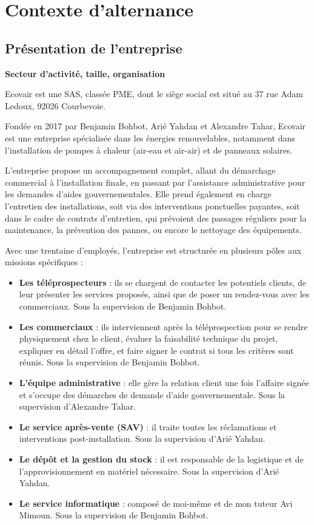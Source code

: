 

\section{Contexte d’alternance}
\label{context}

\subsection{Présentation de l’entreprise}

\textbf{Secteur d’activité, taille, organisation}

Ecovair est une SAS, classée PME, dont le siège social est situé au 37 rue Adam Ledoux, 92026 Courbevoie.

Fondée en 2017 par Benjamin Bohbot, Arié Yahdan et Alexandre Tahar, Ecovair est une entreprise spécialisée dans les énergies renouvelables, notamment dans l'installation de pompes à chaleur (air-eau et air-air) et de panneaux solaires.

L’entreprise propose un accompagnement complet, allant du démarchage commercial à l’installation finale, en passant par l’assistance administrative pour les demandes d’aides gouvernementales. Elle prend également en charge l’entretien des installations, soit via des interventions ponctuelles payantes, soit dans le cadre de contrats d’entretien, qui prévoient des passages réguliers pour la maintenance, la prévention des pannes, ou encore le nettoyage des équipements.

Avec une trentaine d’employés, l’entreprise est structurée en plusieurs pôles aux missions spécifiques :

\begin{itemize}
    \item \textbf{Les téléprospecteurs} : ils se chargent de contacter les potentiels clients, de leur présenter les services proposés, ainsi que de poser un rendez-vous avec les commerciaux. Sous la supervision de Benjamin Bohbot.
    \item \textbf{Les commerciaux} : ils interviennent après la téléprospection pour se rendre physiquement chez le client, évaluer la faisabilité technique du projet, expliquer en détail l’offre, et faire signer le contrat si tous les critères sont réunis. Sous la supervision de Benjamin Bohbot.
    \item \textbf{L’équipe administrative} : elle gère la relation client une fois l’affaire signée et s’occupe des démarches de demande d’aide gouvernementale. Sous la supervision d’Alexandre Tahar.
    \item \textbf{Le service après-vente (SAV)} : il traite toutes les réclamations et interventions post-installation. Sous la supervision d’Arié Yahdan.
    \item \textbf{Le dépôt et la gestion du stock} : il est responsable de la logistique et de l’approvisionnement en matériel nécessaire. Sous la supervision d’Arié Yahdan.
    \item \textbf{Le service informatique} : composé de moi-même et de mon tuteur Avi Mimoun. Sous la supervision de Benjamin Bohbot.
\end{itemize}

